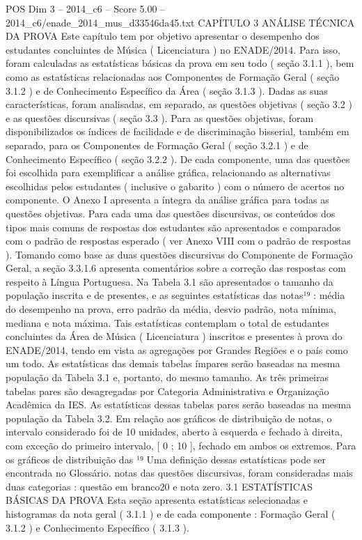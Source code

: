 \begin{textsample}{POS Dim 3 – 2014\_c6 – Score 5.00 – 2014\_c6/enade\_2014\_mus\_d33546da45.txt}  \label{ex:f3_pos_038}
CAPÍTULO 3 ANÁLISE TÉCNICA DA PROVA Este capítulo tem por objetivo apresentar o desempenho dos estudantes concluintes de Música ( Licenciatura ) no ENADE/2014.
Para isso, foram calculadas as estatísticas básicas da prova em seu todo ( seção 3.1.1 ), bem como as estatísticas relacionadas aos Componentes de Formação Geral ( seção 3.1.2 ) e de Conhecimento Específico da Área ( seção 3.1.3 ).
Dadas as suas características, foram analisadas, em separado, as questões objetivas ( seção 3.2 ) e as questões discursivas ( seção 3.3 ).
Para as questões objetivas, foram disponibilizados os índices de facilidade e de discriminação bisserial, também em separado, para os Componentes de Formação Geral ( seção 3.2.1 ) e de Conhecimento Específico ( seção 3.2.2 ).
De cada componente, uma das questões foi escolhida para exemplificar a análise gráfica, relacionando as alternativas escolhidas pelos estudantes ( inclusive o gabarito ) com o número de acertos no componente.
O Anexo I apresenta a íntegra da análise gráfica para todas as questões objetivas.
Para cada uma das questões discursivas, os conteúdos dos tipos mais comuns de respostas dos estudantes são apresentados e comparados com o padrão de respostas esperado ( ver Anexo VIII com o padrão de respostas ).
Tomando como base as duas questões discursivas do Componente de Formação Geral, a seção 3.3.1.6 apresenta comentários sobre a correção das respostas com respeito à Língua Portuguesa.
Na Tabela 3.1 são apresentados o tamanho da população inscrita e de presentes, e as seguintes estatísticas das notas¹⁹ : média do desempenho na prova, erro padrão da média, desvio padrão, nota mínima, mediana e nota máxima.
Tais estatísticas contemplam o total de estudantes concluintes da Área de Música ( Licenciatura ) inscritos e presentes à prova do ENADE/2014, tendo em vista as agregações por Grandes Regiões e o país como um todo.
As estatísticas das demais tabelas ímpares serão baseadas na mesma população da Tabela 3.1 e, portanto, do mesmo tamanho.
As três primeiras tabelas pares são desagregadas por Categoria Administrativa e Organização Acadêmica da IES.
As estatísticas dessas tabelas pares serão baseadas na mesma população da Tabela 3.2.
Em relação aos gráficos de distribuição de notas, o intervalo considerado foi de 10 unidades, aberto à esquerda e fechado à direita, com exceção do primeiro intervalo, [ 0 ; 10 ], fechado em ambos os extremos.
Para os gráficos de distribuição das ¹⁹ Uma definição dessas estatísticas pode ser encontrada no Glossário. notas das questões discursivas, foram consideradas mais duas categorias : questão em branco20 e nota zero. 3.1 ESTATÍSTICAS BÁSICAS DA PROVA Esta seção apresenta estatísticas selecionadas e histogramas da nota geral ( 3.1.1 ) e de cada componente : Formação Geral ( 3.1.2 ) e Conhecimento Específico ( 3.1.3 ).

\end{textsample}
